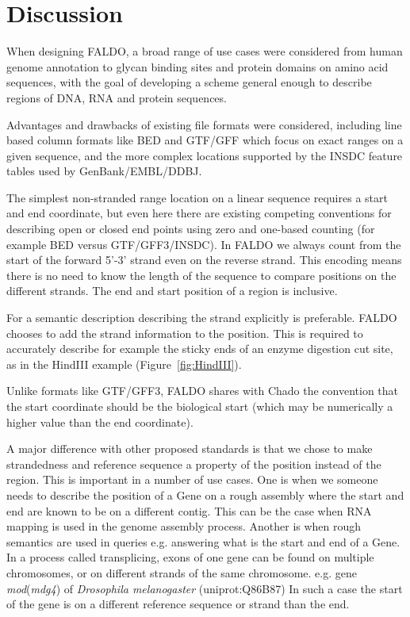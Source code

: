 \section*{Discussion}
When designing FALDO, a broad range of use cases were considered from
human genome annotation to glycan binding sites and protein domains on
amino acid sequences, with the goal of developing a scheme general enough
to describe regions of DNA, RNA and protein sequences.

Advantages and drawbacks of existing file formats were considered, including
line based column formats like BED and GTF/GFF which focus on exact
ranges on a given sequence, and the more complex locations supported
by the INSDC feature tables used by GenBank/EMBL/DDBJ.

The simplest non-stranded range location on a linear sequence requires
a start and end coordinate, but even here there are existing competing
conventions for describing open or closed end points using zero and
one-based counting (for example BED versus GTF/GFF3/INSDC).
In FALDO we always count from the start of the forward 5'-3' strand even on the reverse strand.
This encoding means there is no need to know the length of the sequence to compare positions on the different strands.
The end and start position of a region is inclusive.



For a semantic description describing the strand explicitly is preferable.
FALDO chooses to add the strand information to the position. 
This is required to accurately describe for example the sticky ends
of an enzyme digestion cut site, as in the HindIII example (Figure~\ref{fig:HindIII}).

Unlike formats like GTF/GFF3, FALDO shares with Chado\cite{Chado2007} the convention
that the start coordinate should be the biological start (which 
may be numerically a higher value than the end coordinate).

A major difference with other proposed standards is that we chose to make strandedness and reference sequence a property of the position instead of the region.
This is important in a number of use cases.
One is when we someone needs to describe the position of a Gene on a rough assembly where the start and end are known to be on a different contig. 
This can be the case when RNA mapping is used in the genome assembly process.
Another is when rough semantics are used in queries e.g. answering what is the start and end of a Gene. 
In a process called transplicing, exons of one gene can be found on multiple chromosomes, or on different strands of the same chromosome. e.g. 
gene \textit{mod}(\textit{mdg4}) of \textit{Drosophila melanogaster} (uniprot:Q86B87)
In such a case the start of the gene is on a different reference sequence or strand than the end.

